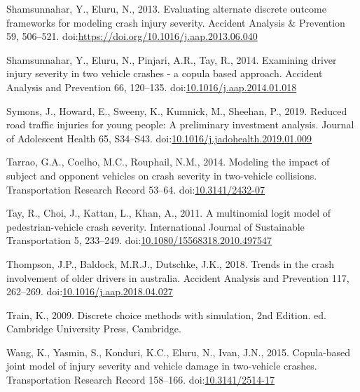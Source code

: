 \documentclass[]{elsarticle} %
\begin{document}
\leavevmode\hypertarget{ref-Shamsunnahar2013evaluating}{}%
Shamsunnahar, Y., Eluru, N., 2013. Evaluating alternate discrete outcome
frameworks for modeling crash injury severity. Accident Analysis \&
Prevention 59, 506--521.
doi:\href{https://doi.org/https://doi.org/10.1016/j.aap.2013.06.040}{https://doi.org/10.1016/j.aap.2013.06.040}

\leavevmode\hypertarget{ref-Shamsunnahar2014examining}{}%
Shamsunnahar, Y., Eluru, N., Pinjari, A.R., Tay, R., 2014. Examining
driver injury severity in two vehicle crashes - a copula based approach.
Accident Analysis and Prevention 66, 120--135.
doi:\href{https://doi.org/10.1016/j.aap.2014.01.018}{10.1016/j.aap.2014.01.018}

\leavevmode\hypertarget{ref-Symons2019reduced}{}%
Symons, J., Howard, E., Sweeny, K., Kumnick, M., Sheehan, P., 2019.
Reduced road traffic injuries for young people: A preliminary investment
analysis. Journal of Adolescent Health 65, S34--S43.
doi:\href{https://doi.org/10.1016/j.jadohealth.2019.01.009}{10.1016/j.jadohealth.2019.01.009}

\leavevmode\hypertarget{ref-Tarrao2014modeling}{}%
Tarrao, G.A., Coelho, M.C., Rouphail, N.M., 2014. Modeling the impact of
subject and opponent vehicles on crash severity in two-vehicle
collisions. Transportation Research Record 53--64.
doi:\href{https://doi.org/10.3141/2432-07}{10.3141/2432-07}

\leavevmode\hypertarget{ref-Tay2011multinomial}{}%
Tay, R., Choi, J., Kattan, L., Khan, A., 2011. A multinomial logit model
of pedestrian-vehicle crash severity. International Journal of
Sustainable Transportation 5, 233--249.
doi:\href{https://doi.org/10.1080/15568318.2010.497547}{10.1080/15568318.2010.497547}

\leavevmode\hypertarget{ref-Thompson2018trends}{}%
Thompson, J.P., Baldock, M.R.J., Dutschke, J.K., 2018. Trends in the
crash involvement of older drivers in australia. Accident Analysis and
Prevention 117, 262--269.
doi:\href{https://doi.org/10.1016/j.aap.2018.04.027}{10.1016/j.aap.2018.04.027}

\leavevmode\hypertarget{ref-Train2009discrete}{}%
Train, K., 2009. Discrete choice methods with simulation, 2nd Edition.
ed. Cambridge University Press, Cambridge.

\leavevmode\hypertarget{ref-Wang2015copula}{}%
Wang, K., Yasmin, S., Konduri, K.C., Eluru, N., Ivan, J.N., 2015.
Copula-based joint model of injury severity and vehicle damage in
two-vehicle crashes. Transportation Research Record 158--166.
doi:\href{https://doi.org/10.3141/2514-17}{10.3141/2514-17}
\end{document}
